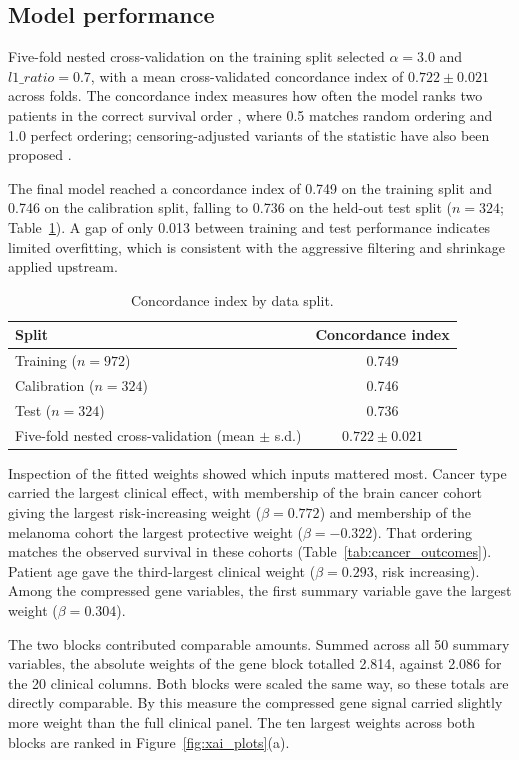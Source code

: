 \documentclass[10pt,a4paper]{article}
\begin{document}
\subsection{Model performance}

Five-fold nested cross-validation on the training split selected $\alpha = 3.0$ and
$l1\_ratio = 0.7$, with a mean cross-validated concordance index of
$0.722 \pm 0.021$ across folds. The concordance index measures how often the model
ranks two patients in the correct survival order \citep{harrell1982evaluating},
where 0.5 matches random ordering and 1.0 perfect ordering; censoring-adjusted
variants of the statistic have also been proposed \citep{uno2011c}.

The final model reached a concordance index of 0.749 on the training split and
0.746 on the calibration split, falling to 0.736 on the held-out test split
($n = 324$; Table~\ref{tab:cindex}). A gap of only 0.013 between training and test
performance indicates limited overfitting, which is consistent with the aggressive
filtering and shrinkage applied upstream.

\begin{table}[!htbp]
\centering
\caption{Concordance index by data split.}
\label{tab:cindex}
\begin{tabular}{lc}
\toprule
Split & Concordance index \\
\midrule
Training ($n = 972$) & 0.749 \\
Calibration ($n = 324$) & 0.746 \\
Test ($n = 324$) & 0.736 \\
Five-fold nested cross-validation (mean $\pm$ s.d.) & $0.722 \pm 0.021$ \\
\bottomrule
\end{tabular}
\end{table}

Inspection of the fitted weights showed which inputs mattered most. Cancer type
carried the largest clinical effect, with membership of the brain cancer cohort
giving the largest risk-increasing weight ($\beta = 0.772$) and membership of the
melanoma cohort the largest protective weight ($\beta = -0.322$). That ordering
matches the observed survival in these cohorts
(Table~\ref{tab:cancer_outcomes}). Patient age gave the third-largest clinical
weight ($\beta = 0.293$, risk increasing). Among the compressed gene variables, the
first summary variable gave the largest weight ($\beta = 0.304$).

The two blocks contributed comparable amounts. Summed across all 50 summary
variables, the absolute weights of the gene block totalled 2.814, against 2.086 for
the 20 clinical columns. Both blocks were scaled the same way, so these totals are
directly comparable. By this measure the compressed gene signal carried slightly
more weight than the full clinical panel. The ten largest weights across both
blocks are ranked in Figure~\ref{fig:xai_plots}(a).
\end{document}
